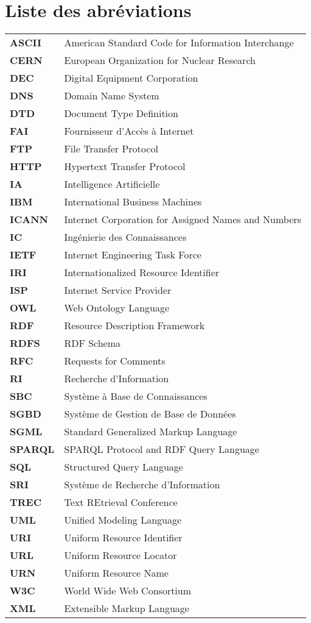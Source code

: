 
\chapter*{Liste des abréviations}

\begin{tabular}{l l}
\textbf{ASCII} & American Standard Code for Information Interchange\\
\textbf{CERN} & European Organization for Nuclear Research\\
\textbf{DEC} & Digital Equipment Corporation\\
\textbf{DNS} & Domain Name System\\
\textbf{DTD} & Document Type Definition\\
\textbf{FAI} & Fournisseur d'Accès à Internet\\
\textbf{FTP} & File Transfer Protocol\\
\textbf{HTTP} & Hypertext Transfer Protocol\\
\textbf{IA} & Intelligence Artificielle\\
\textbf{IBM} & International Business Machines\\
\textbf{ICANN} & Internet Corporation for Assigned Names and Numbers\\
\textbf{IC} & Ingénierie des Connaissances\\
\textbf{IETF} & Internet Engineering Task Force\\
\textbf{IRI} & Internationalized Resource Identifier\\
\textbf{ISP} & Internet Service Provider\\
\textbf{OWL} & Web Ontology Language\\
\textbf{RDF} & Resource Description Framework\\
\textbf{RDFS} & RDF Schema\\
\textbf{RFC} & Requests for Comments\\
\textbf{RI} & Recherche d'Information\\
\textbf{SBC} & Système à Base de Connaissances\\
\textbf{SGBD} & Système de Gestion de Base de Données\\
\textbf{SGML} & Standard Generalized Markup Language\\
\textbf{SPARQL} & SPARQL Protocol and RDF Query Language\\
\textbf{SQL} & Structured Query Language\\
\textbf{SRI} & Système de Recherche d'Information\\
\textbf{TREC} & Text REtrieval Conference\\
\textbf{UML} & Unified Modeling Language\\
\textbf{URI} & Uniform Resource Identifier\\
\textbf{URL} & Uniform Resource Locator\\
\textbf{URN} & Uniform Resource Name\\
\textbf{W3C} & World Wide Web Consortium\\
\textbf{XML} & Extensible Markup Language\\
\end{tabular}





